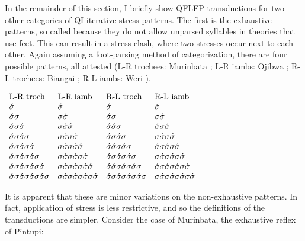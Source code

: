 \documentclass[12pt]{article}
\newcommand{\sig}{\sigma}
\newcommand{\ass}{\acute{\sig}}
\newcommand{\tm}{\textnormal}
\newcommand{\tr}{\ass\sig}
\newcommand{\im}{\sig\ass}
\begin{document}
In the remainder of this section, I briefly show QFLFP transductions for two other categories of QI iterative stress patterns. The first is the exhaustive patterns, so called because they do not allow unparsed syllables in theories that use feet. This can result in a stress clash, where two stresses occur next to each other. Again assuming a foot-parsing method of categorization, there are four possible patterns, all attested (L-R trochees: Murinbata \citep{street81}; L-R iambs: Ojibwa \citep{kaye73}; R-L trochees: Biangai \citep{dubert73}; R-L iambs: Weri \citep{boxwell66}).

 \begin{exe}
 \item	$\begin{array}[t]{llll}
  	\tm{L-R troch}   & \tm{L-R iamb}   &   \tm{R-L troch}  & \tm{R-L iamb}       \\
  	\ass             & \ass            &   \ass            & \ass                \\
  	\tr              & \im             &   \tr             & \im                 \\
  	\tr\ass          & \im\ass         &   \ass\tr         & \ass\im             \\
  	\tr\tr           & \im\im          &   \tr\tr          & \im\im              \\
  	\tr\tr\ass       & \im\im\ass      &   \ass\tr\tr      & \ass\im\im          \\
  	\tr\tr\tr        & \im\im\im       &   \tr\tr\tr       & \im\im\im           \\
  	\tr\tr\tr\ass    & \im\im\im\ass   &   \ass\tr\tr\tr   & \ass\im\im\im       \\
  	\tr\tr\tr\tr     & \im\im\im\im    &   \tr\tr\tr\tr    & \im\im\im\im
  	
 	\end{array}$
 	\label{iterativeex}
\end{exe}

\noindent
It is apparent that these are minor variations on the non-exhaustive patterns. In fact, application of stress is less restrictive, and so the definitions of the transductions are simpler. Consider the case of Murinbata, the exhaustive reflex of Pintupi:
\end{document}
